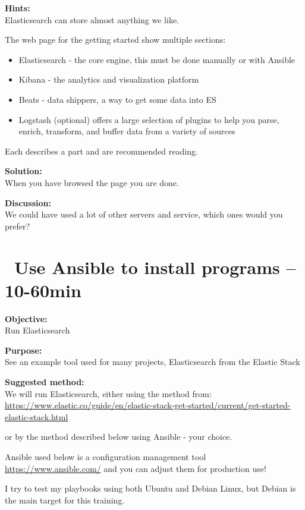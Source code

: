 \documentclass[a4paper,11pt,notitlepage]{report}
\begin{document}
{\bf Hints:}\\
Elasticsearch can store almost anything we like.

The web page for the getting started show multiple sections:
\begin{itemize}
\item Elasticsearch - the core engine, this must be done manually or with Ansible
\item Kibana - the analytics and visualization platform
\item Beats - data shippers, a way to get some data into ES
\item Logstash (optional) offers a large selection of plugins to help you parse, enrich, transform, and buffer data from a variety of sources
\end{itemize}

Each describes a part and are recommended reading.


{\bf Solution:}\\
When you have browsed the page you are done.

{\bf Discussion:}\\
We could have used a lot of other servers and service, which ones would you prefer?



\chapter{\faExclamationTriangle\ Use Ansible to install programs -- 10-60min}
\label{ex:basicansible}


{\bf Objective:}\\
Run Elasticsearch

{\bf Purpose:}\\
See an example tool used for many projects, Elasticsearch from the Elastic Stack

{\bf Suggested method:}\\
We will run Elasticsearch, either using the method from:\\{\footnotesize
\url{https://www.elastic.co/guide/en/elastic-stack-get-started/current/get-started-elastic-stack.html}}

or by the method described below using Ansible - your choice.

Ansible used below is a configuration management tool \url{https://www.ansible.com/} and you can adjust them for production use!

I try to test my playbooks using both Ubuntu and Debian Linux, but Debian is the main target for this training.
\end{document}
